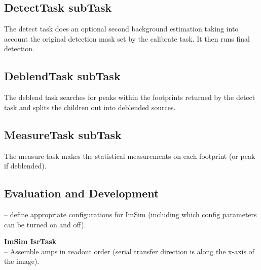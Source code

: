 \documentclass[prd, nofootinbib, floatfix, 11pt,tightenlines,times]{article}
\begin{document}
\subsection{DetectTask subTask}
The detect task does an optional second background estimation taking
into account the original detection mask set by the calibrate task.
It then runs final detection.

\subsection{DeblendTask subTask}
The deblend task searches for peaks within the footprints returned by
the detect task and splits the children out into deblended sources.

\subsection{MeasureTask subTask}
The measure task makes the statistical measurements on each footprint (or peak if deblended).

\subsection{Evaluation and Development}

-- define appropriate configurations for ImSim (including which config
parameters can be turned on and off).

{\bf ImSim IsrTask}\\
-- Assemble amps in readout order (serial transfer direction is along the x-axis of the image).


\end{document}
